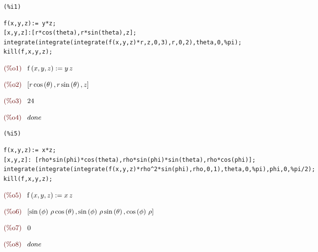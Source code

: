 \documentclass{article}
\begin{document}
\noindent
\begin{minipage}[t]{8ex}{\color{red}\bf
\begin{verbatim}
(%i1) 
\end{verbatim}}
\end{minipage}
\begin{minipage}[t]{\textwidth}{\color{blue}
\begin{verbatim}
f(x,y,z):= y*z;
[x,y,z]:[r*cos(theta),r*sin(theta),z];
integrate(integrate(integrate(f(x,y,z)*r,z,0,3),r,0,2),theta,0,%pi);
kill(f,x,y,z);
\end{verbatim}}
\end{minipage}
\begin{math}\displaystyle
\parbox{8ex}{\color{labelcolor}(\%o1) }
\mathrm{f}\left( x,y,z\right) :=y\,z
\end{math}

\begin{math}\displaystyle
\parbox{8ex}{\color{labelcolor}(\%o2) }
[r\,\mathrm{cos}\left( \theta\right) ,r\,\mathrm{sin}\left( \theta\right) ,z]
\end{math}

\begin{math}\displaystyle
\parbox{8ex}{\color{labelcolor}(\%o3) }
24
\end{math}

\begin{math}\displaystyle
\parbox{8ex}{\color{labelcolor}(\%o4) }
done
\end{math}


\noindent
\begin{minipage}[t]{8ex}{\color{red}\bf
\begin{verbatim}
(%i5) 
\end{verbatim}}
\end{minipage}
\begin{minipage}[t]{\textwidth}{\color{blue}
\begin{verbatim}
f(x,y,z):= x*z;
[x,y,z]: [rho*sin(phi)*cos(theta),rho*sin(phi)*sin(theta),rho*cos(phi)];
integrate(integrate(integrate(f(x,y,z)*rho^2*sin(phi),rho,0,1),theta,0,%pi),phi,0,%pi/2);
kill(f,x,y,z);
\end{verbatim}}
\end{minipage}
\begin{math}\displaystyle
\parbox{8ex}{\color{labelcolor}(\%o5) }
\mathrm{f}\left( x,y,z\right) :=x\,z
\end{math}

\begin{math}\displaystyle
\parbox{8ex}{\color{labelcolor}(\%o6) }
[\mathrm{sin}\left( \phi\right) \,\rho\,\mathrm{cos}\left( \theta\right) ,\mathrm{sin}\left( \phi\right) \,\rho\,\mathrm{sin}\left( \theta\right) ,\mathrm{cos}\left( \phi\right) \,\rho]
\end{math}

\begin{math}\displaystyle
\parbox{8ex}{\color{labelcolor}(\%o7) }
0
\end{math}

\begin{math}\displaystyle
\parbox{8ex}{\color{labelcolor}(\%o8) }
done
\end{math}
\end{document}

